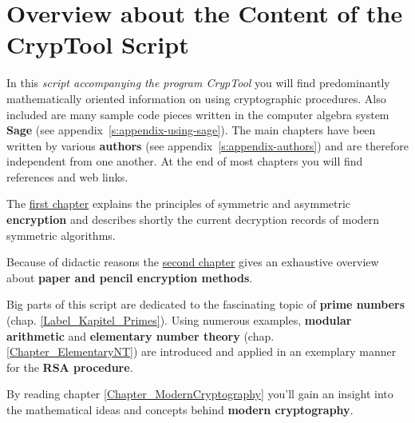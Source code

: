 
\makeatletter \renewcommand{\thepage}{~\csname @roman\endcsname \c@page~} \makeatother
\clearpage{}
\makeatletter \renewcommand{\thepage}{\csname @roman\endcsname \c@page} \makeatother
{}
\chapter*{Overview about the Content of the CrypTool Script}  

\parskip 4pt
\noindent In this {\em script accompanying the program CrypTool} 
you will find predominantly mathematically oriented information on using
cryptographic procedures. Also included are many sample code pieces written in the
computer algebra system {\bf Sage} (see appendix~\ref{s:appendix-using-sage}).
The main chapters have been written by various {\bf authors}
(see appendix~\ref{s:appendix-authors}) %
and are therefore independent from one another. At the end of most chapters
you will find references and web links.

The \hyperlink{Kapitel_1}{first chapter} explains the principles of symmetric
and asymmetric {\bf encryption} and describes shortly the current decryption
records of modern symmetric algorithms.

Because of didactic reasons the \hyperlink{Kapitel_PaperandPencil}
{second chapter} gives an exhaustive overview
about {\bf paper and pencil encryption methods}.

Big parts of this script are dedicated to the fascinating topic of 
{\bf prime numbers} (chap. \ref{Label_Kapitel_Primes}).
Using numerous examples,
{\bf modular arithmetic} and 
{\bf elementary number theory} (chap. \ref{Chapter_ElementaryNT})
are introduced and applied in an exemplary manner for the {\bf RSA procedure}.

By reading chapter \ref{Chapter_ModernCryptography}
you'll gain an insight into the mathematical ideas and concepts behind 
{\bf modern cryptography}.

